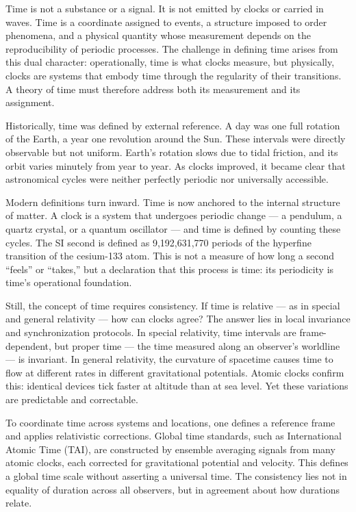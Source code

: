 Time is not a substance or a signal. It is not emitted by clocks or carried in waves. Time is a coordinate assigned to events, a structure imposed to order phenomena, and a physical quantity whose measurement depends on the reproducibility of periodic processes. The challenge in defining time arises from this dual character: operationally, time is what clocks measure, but physically, clocks are systems that embody time through the regularity of their transitions. A theory of time must therefore address both its measurement and its assignment.

Historically, time was defined by external reference. A day was one full rotation of the Earth, a year one revolution around the Sun. These intervals were directly observable but not uniform. Earth's rotation slows due to tidal friction, and its orbit varies minutely from year to year. As clocks improved, it became clear that astronomical cycles were neither perfectly periodic nor universally accessible.

Modern definitions turn inward. Time is now anchored to the internal structure of matter. A clock is a system that undergoes periodic change — a pendulum, a quartz crystal, or a quantum oscillator — and time is defined by counting these cycles. The SI second is defined as 9,192,631,770 periods of the hyperfine transition of the cesium-133 atom. This is not a measure of how long a second “feels” or “takes,” but a declaration that this process is time: its periodicity is time’s operational foundation.

Still, the concept of time requires consistency. If time is relative — as in special and general relativity — how can clocks agree? The answer lies in local invariance and synchronization protocols. In special relativity, time intervals are frame-dependent, but proper time — the time measured along an observer’s worldline — is invariant. In general relativity, the curvature of spacetime causes time to flow at different rates in different gravitational potentials. Atomic clocks confirm this: identical devices tick faster at altitude than at sea level. Yet these variations are predictable and correctable.

To coordinate time across systems and locations, one defines a reference frame and applies relativistic corrections. Global time standards, such as International Atomic Time (TAI), are constructed by ensemble averaging signals from many atomic clocks, each corrected for gravitational potential and velocity. This defines a global time scale without asserting a universal time. The consistency lies not in equality of duration across all observers, but in agreement about how durations relate.

